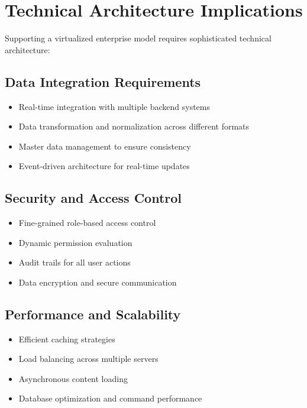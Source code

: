 \section{Technical Architecture Implications}
\label{sec:technical-implications}

Supporting a virtualized enterprise model requires sophisticated technical architecture:

\subsection{Data Integration Requirements}

\begin{itemize}
	\item Real-time integration with multiple backend systems
	\item Data transformation and normalization across different formats
	\item Master data management to ensure consistency
	\item Event-driven architecture for real-time updates
\end{itemize}

\subsection{Security and Access Control}

\begin{itemize}
	\item Fine-grained role-based access control
	\item Dynamic permission evaluation
	\item Audit trails for all user actions
	\item Data encryption and secure communication
\end{itemize}

\subsection{Performance and Scalability}

\begin{itemize}
	\item Efficient caching strategies
	\item Load balancing across multiple servers
	\item Asynchronous content loading
	\item Database optimization and command performance
\end{itemize}

